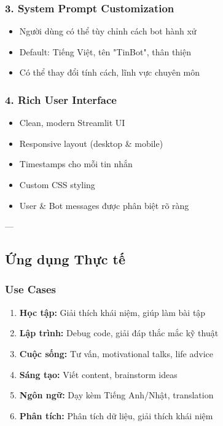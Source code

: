 \documentclass[12pt,a4paper]{article}
\begin{document}
\subsubsection{3. System Prompt Customization}
\begin{itemize}
    \item Người dùng có thể tùy chỉnh cách bot hành xử
    \item Default: Tiếng Việt, tên "TinBot", thân thiện
    \item Có thể thay đổi tính cách, lĩnh vực chuyên môn
\end{itemize}

\subsubsection{4. Rich User Interface}
\begin{itemize}
    \item Clean, modern Streamlit UI
    \item Responsive layout (desktop \& mobile)
    \item Timestamps cho mỗi tin nhắn
    \item Custom CSS styling
    \item User \& Bot messages được phân biệt rõ ràng
\end{itemize}

---

\subsection{Ứng dụng Thực tế}

\subsubsection{Use Cases}

\begin{enumerate}
    \item \textbf{Học tập:} Giải thích khái niệm, giúp làm bài tập
    \item \textbf{Lập trình:} Debug code, giải đáp thắc mắc kỹ thuật
    \item \textbf{Cuộc sống:} Tư vấn, motivational talks, life advice
    \item \textbf{Sáng tạo:} Viết content, brainstorm ideas
    \item \textbf{Ngôn ngữ:} Dạy kèm Tiếng Anh/Nhật, translation
    \item \textbf{Phân tích:} Phân tích dữ liệu, giải thích khái niệm
\end{enumerate}
\end{document}
